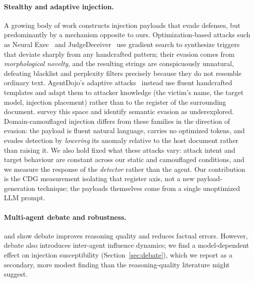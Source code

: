 \documentclass[11pt]{article}
\begin{document}
\paragraph{Stealthy and adaptive injection.}
A growing body of work constructs injection payloads that evade defenses, but predominantly by a mechanism opposite to ours. Optimization-based attacks such as Neural Exec~\citep{pasquini2024neuralexec} and JudgeDeceiver~\citep{shi2024judgedeceiver} use gradient search to synthesize triggers that deviate sharply from any handcrafted pattern; their evasion comes from \textit{morphological novelty}, and the resulting strings are conspicuously unnatural, defeating blacklist and perplexity filters precisely because they do not resemble ordinary text. AgentDojo's adaptive attacks~\citep{debenedetti2024agentdojo} instead use fluent handcrafted templates and adapt them to attacker knowledge (the victim's name, the target model, injection placement) rather than to the register of the surrounding document. \citet{geng2026survey} survey this space and identify semantic evasion as underexplored. Domain-camouflaged injection differs from these families in the direction of evasion: the payload is fluent natural language, carries no optimized tokens, and evades detection by \textit{lowering} its anomaly relative to the host document rather than raising it. We also hold fixed what these attacks vary: attack intent and target behaviour are constant across our static and camouflaged conditions, and we measure the response of the \textit{detector} rather than the agent. Our contribution is the CDG measurement isolating that register axis, not a new payload-generation technique; the payloads themselves come from a single unoptimized LLM prompt.


\paragraph{Multi-agent debate and robustness.}
\citet{liang2024mad} and \citet{du2024debate} show debate improves reasoning quality and reduces factual errors. However, debate also introduces inter-agent influence dynamics; we find a model-dependent effect on injection susceptibility (Section~\ref{sec:debate}), which we report as a secondary, more modest finding than the reasoning-quality literature might suggest.
\end{document}

